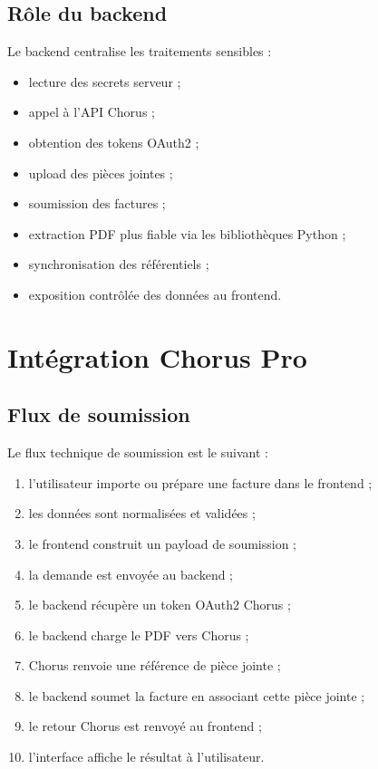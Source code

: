 \documentclass[11pt,a4paper]{article}
\begin{document}
\subsection{Rôle du backend}

Le backend centralise les traitements sensibles :

\begin{itemize}
  \item lecture des secrets serveur ;
  \item appel à l'API Chorus ;
  \item obtention des tokens OAuth2 ;
  \item upload des pièces jointes ;
  \item soumission des factures ;
  \item extraction PDF plus fiable via les bibliothèques Python ;
  \item synchronisation des référentiels ;
  \item exposition contrôlée des données au frontend.
\end{itemize}

\section{Intégration Chorus Pro}

\subsection{Flux de soumission}

Le flux technique de soumission est le suivant :

\begin{enumerate}
  \item l'utilisateur importe ou prépare une facture dans le frontend ;
  \item les données sont normalisées et validées ;
  \item le frontend construit un payload de soumission ;
  \item la demande est envoyée au backend ;
  \item le backend récupère un token OAuth2 Chorus ;
  \item le backend charge le PDF vers Chorus ;
  \item Chorus renvoie une référence de pièce jointe ;
  \item le backend soumet la facture en associant cette pièce jointe ;
  \item le retour Chorus est renvoyé au frontend ;
  \item l'interface affiche le résultat à l'utilisateur.
\end{enumerate}
\end{document}
